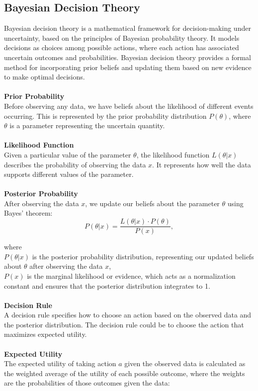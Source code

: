 \documentclass[12pt]{report}
\begin{document}
\subsection{Bayesian Decision Theory}\label{bt}
Bayesian decision theory is a mathematical framework for decision-making
under uncertainty, based on the principles of Bayesian probability theory.
It models decisions as choices among possible actions, where each action
has associated uncertain outcomes and probabilities. Bayesian decision
theory provides a formal method for incorporating prior beliefs and
updating them based on new evidence to make optimal decisions.\\
\\
\textbf{Prior Probability}\\
Before observing any data, we have beliefs about the likelihood of different events
occurring. This is represented by the prior probability
distribution \( P(\theta) \), where \( \theta \) is a parameter representing the uncertain
quantity.\\
\\
\textbf{Likelihood Function}\\
Given a particular value of the parameter \( \theta \), the likelihood
function \( L(\theta | x) \) describes the probability of observing
the data \( x \). It represents how well the data supports different
values of the parameter.\\
\\
\textbf{Posterior Probability}\\
After observing the data \( x \), we update our beliefs about the
parameter \( \theta \) using Bayes' theorem:\\

\begin{equation}
    P(\theta | x) = \frac{L(\theta | x) \cdot P(\theta)}{P(x)},
\end{equation}

\noindent where\\
\( P(\theta | x) \) is the posterior probability distribution, representing our updated beliefs about \( \theta \) after observing the data \( x \),\\
\( P(x) \) is the marginal likelihood or evidence, which acts as a normalization constant and ensures that the posterior distribution integrates to 1.\\
\\
\textbf{Decision Rule}\\
A decision rule specifies how to choose an action based on the observed data and the
posterior distribution. The decision rule could be to choose the action that maximizes
expected utility.\\
\\
\noindent \textbf{Expected Utility}\\
The expected utility of taking action \( a \) given the observed data is calculated
as the weighted average of the utility of each possible outcome, where the weights
are the probabilities of those outcomes given the data:\\
\end{document}
